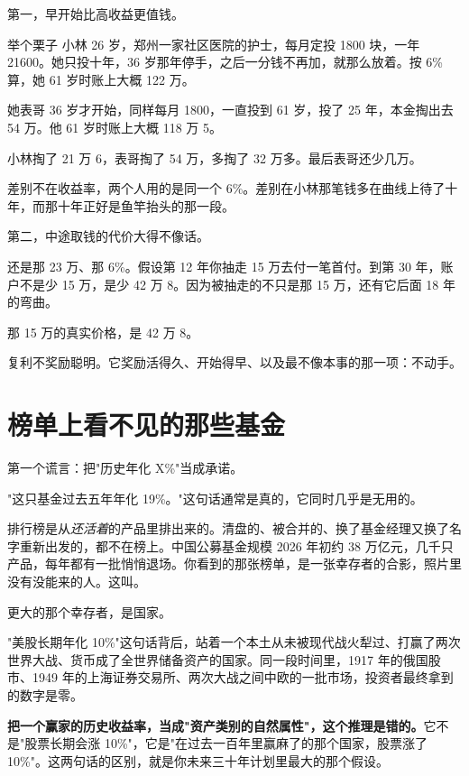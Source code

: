 第一，早开始比高收益更值钱。

\begin{egbox}{举个栗子}
小林 26 岁，郑州一家社区医院的护士，每月定投 1800 块，一年 21600。她只投十年，36 岁那年停手，之后一分钱不再加，就那么放着。按 6\% 算，她 61 岁时账上大概 122 万。

她表哥 36 岁才开始，同样每月 1800，一直投到 61 岁，投了 25 年，本金掏出去 54 万。他 61 岁时账上大概 118 万 5。

小林掏了 21 万 6，表哥掏了 54 万，多掏了 32 万多。最后表哥还少几万。

差别不在收益率，两个人用的是同一个 6\%。差别在小林那笔钱多在曲线上待了十年，而那十年正好是鱼竿抬头的那一段。

\end{egbox}

第二，中途取钱的代价大得不像话。

还是那 23 万、那 6\%。假设第 12 年你抽走 15 万去付一笔首付。到第 30 年，账户不是少 15 万，是少 42 万 8。因为被抽走的不只是那 15 万，还有它后面 18 年的弯曲。

那 15 万的真实价格，是 42 万 8。

\begin{pullquote}{}
复利不奖励聪明。它奖励活得久、开始得早、以及最不像本事的那一项：不动手。
\end{pullquote}

\section{榜单上看不见的那些基金}

第一个谎言：把"历史年化 X\%"当成承诺。

"这只基金过去五年年化 19\%。"这句话通常是真的，它同时几乎是无用的。

排行榜是从\emph{还活着}的产品里排出来的。清盘的、被合并的、换了基金经理又换了名字重新出发的，都不在榜上。中国公募基金规模 2026 年初约 38 万亿元，几千只产品，每年都有一批悄悄退场。你看到的那张榜单，是一张幸存者的合影，照片里没有没能来的人。这叫。

更大的那个幸存者，是国家。

"美股长期年化 10\%"这句话背后，站着一个本土从未被现代战火犁过、打赢了两次世界大战、货币成了全世界储备资产的国家。同一段时间里，1917 年的俄国股市、1949 年的上海证券交易所、两次大战之间中欧的一批市场，投资者最终拿到的数字是零。

\textbf{把一个赢家的历史收益率，当成"资产类别的自然属性"，这个推理是错的。}它不是"股票长期会涨 10\%"，它是"在过去一百年里赢麻了的那个国家，股票涨了 10\%"。这两句话的区别，就是你未来三十年计划里最大的那个假设。

